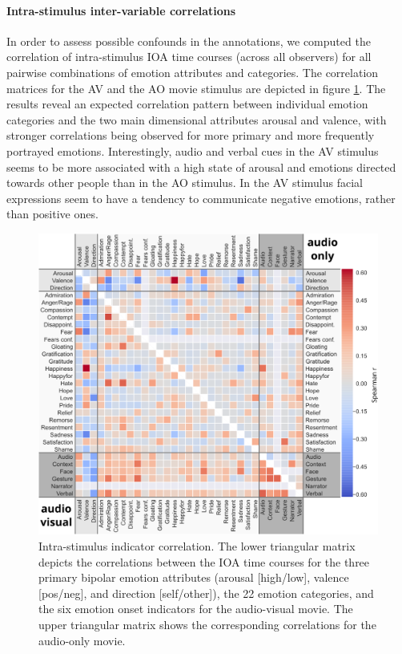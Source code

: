 \documentclass[10pt,a4paper,twocolumn]{article}
\begin{document}
\paragraph{Intra-stimulus inter-variable correlations}

In order to assess possible confounds in the annotations, we computed the
correlation of intra-stimulus IOA time courses (across all observers) for all
pairwise combinations of emotion attributes and categories. The correlation
matrices for the AV and the AO movie stimulus are depicted in figure
\ref{fig:intrastimcorrelation}. The results reveal an expected correlation
pattern between individual emotion categories and the two main dimensional
attributes arousal and valence, with stronger correlations being observed for
more primary and more frequently portrayed emotions. Interestingly, audio and
verbal cues in the AV stimulus seems to be more associated with a high state of
arousal and emotions directed towards other people than in the AO stimulus.  In
the AV stimulus facial expressions seem to have a tendency to communicate
negative emotions, rather than positive ones.


\begin{figure}
  \centering
  \includegraphics[width=\linewidth]{figures/bigcorr}
  \caption{Intra-stimulus indicator correlation. The lower triangular matrix
    depicts the correlations between the IOA time courses for
    the three primary bipolar emotion attributes (arousal [high/low], valence [pos/neg], and direction [self/other]), the
    22 emotion categories, and the six emotion onset indicators for the audio-visual
    movie. The upper triangular matrix shows the corresponding correlations for the
    audio-only movie.
 }
  \label{fig:intrastimcorrelation}
\end{figure}
\end{document}
